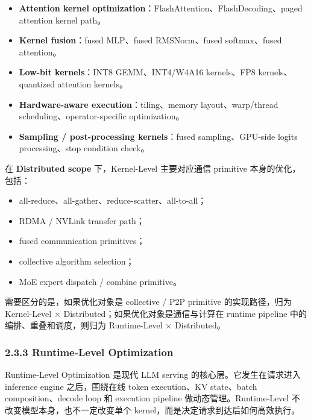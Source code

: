 \documentclass[a4paper,10pt]{ctexart}
\begin{document}
\begin{itemize}
\item \textbf{Attention kernel optimization}：FlashAttention、FlashDecoding、paged attention kernel path。

\item \textbf{Kernel fusion}：fused MLP、fused RMSNorm、fused softmax、fused attention。

\item \textbf{Low-bit kernels}：INT8 GEMM、INT4/W4A16 kernels、FP8 kernels、quantized attention kernels。

\item \textbf{Hardware-aware execution}：tiling、memory layout、warp/thread scheduling、operator-specific optimization。

\item \textbf{Sampling / post-processing kernels}：fused sampling、GPU-side logits processing、stop condition check。

\end{itemize}
在 \textbf{Distributed scope} 下，Kernel-Level 主要对应通信 primitive 本身的优化，包括：


\begin{itemize}
\item all-reduce、all-gather、reduce-scatter、all-to-all；

\item RDMA / NVLink transfer path；

\item fused communication primitives；

\item collective algorithm selection；

\item MoE expert dispatch / combine primitive。

\end{itemize}
需要区分的是，如果优化对象是 collective / P2P primitive 的实现路径，归为 Kernel-Level × Distributed；如果优化对象是通信与计算在 runtime pipeline 中的编排、重叠和调度，则归为 Runtime-Level × Distributed。




\subsubsection*{2.3.3 Runtime-Level Optimization}

Runtime-Level Optimization 是现代 LLM serving 的核心层。它发生在请求进入 inference engine 之后，围绕在线 token execution、KV state、batch composition、decode loop 和 execution pipeline 做动态管理。Runtime-Level 不改变模型本身，也不一定改变单个 kernel，而是决定请求到达后如何高效执行。
\end{document}
